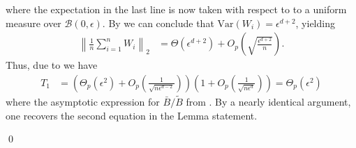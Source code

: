 \documentclass[11pt]{article}
\begin{document}
where the expectation in the last line is now taken with respect to to a uniform measure over $\mathcal{B}(0, \epsilon)$. By  we can conclude that $\text{Var}(W_i) = \epsilon^{d+2}$, yielding
\begin{align*}
    \left\|\frac{1}{n}\sum_{i = 1}^nW_i\right\|_2 &=  \Theta(\epsilon^{d+2}) + O_p\left(\sqrt{\frac{\epsilon^{d + 2}}{n}}\right).
\end{align*}
Thus, due to  we have
\begin{align*}
    T_1 &= \left(\Theta_p\left(\epsilon^2\right) + O_p\left(\frac{1}{\sqrt{n\epsilon^{d-2}}}\right)\right) \left(1 + O_p\left(\frac{1}{\sqrt{n\epsilon^d}}\right)\right) = \Theta_p\left(\epsilon^2\right) \tag{provided $n\epsilon^d \rightarrow \infty$}
\end{align*}
where the asymptotic expression for $\bar{B}/\tilde{B}$ from . By a nearly identical argument, one recovers the second equation in the Lemma statement.

\qed{}
\end{document}
